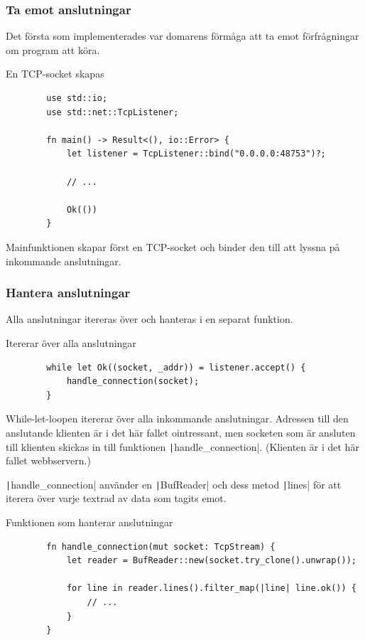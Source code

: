 \documentclass{article}
\begin{document}
\subsubsection{Ta emot anslutningar}

Det första som implementerades var domarens förmåga att ta emot förfrågningar om
program att köra.

\begin{listing}[H]
	\caption{En TCP-socket skapas}
	\begin{verbatim}
		use std::io;
		use std::net::TcpListener;

		fn main() -> Result<(), io::Error> {
			let listener = TcpListener::bind("0.0.0.0:48753")?;

			// ...

			Ok(())
		}
	\end{verbatim}
\end{listing}

Mainfunktionen skapar först en TCP-socket och binder den till att lyssna på
inkommande anslutningar.

\subsubsection{Hantera anslutningar}

Alla anslutningar itereras över och hanteras i en separat funktion.

\begin{listing}[H]
	\caption{Itererar över alla anslutningar}
	\begin{verbatim}
		while let Ok((socket, _addr)) = listener.accept() {
			handle_connection(socket);
		}
	\end{verbatim}
\end{listing}

While-let-loopen itererar över alla inkommande anslutningar.  Adressen till den
anslutande klienten är i det här fallet ointressant, men socketen som är
ansluten till klienten skickas in till funktionen
\texttt|handle_connection|.
(Klienten är i det här fallet webbservern.)

\texttt|handle_connection| använder en
\texttt|BufReader| och dess metod
\texttt|lines| för att iterera över varje textrad av data som tagits emot.

\begin{listing}[H]
	\caption{Funktionen som hanterar anslutningar}
	\begin{verbatim}
		fn handle_connection(mut socket: TcpStream) {
			let reader = BufReader::new(socket.try_clone().unwrap());

			for line in reader.lines().filter_map(|line| line.ok()) {
				// ...
			}
		}
	\end{verbatim}
\end{listing}
\end{document}
